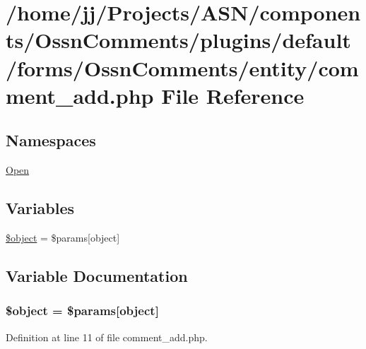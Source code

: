\hypertarget{entity_2comment__add_8php}{}\section{/home/jj/\+Projects/\+A\+S\+N/components/\+Ossn\+Comments/plugins/default/forms/\+Ossn\+Comments/entity/comment\+\_\+add.php File Reference}
\label{entity_2comment__add_8php}
\subsection*{Namespaces}
\begin{DoxyCompactItemize}
\item 
 \hyperlink{namespace_open}{Open}
\end{DoxyCompactItemize}
\subsection*{Variables}
\begin{DoxyCompactItemize}
\item 
\hyperlink{entity_2comment__add_8php_a52123b83a1952a68c5513e47d59ec4a6}{\$object} = \$params\mbox{[}\textquotesingle{}object\textquotesingle{}\mbox{]}
\end{DoxyCompactItemize}


\subsection{Variable Documentation}
\subsubsection[{\texorpdfstring{\$object}{$object}}]{\setlength{\rightskip}{0pt plus 5cm}\$object = \$params\mbox{[}\textquotesingle{}object\textquotesingle{}\mbox{]}}\hypertarget{entity_2comment__add_8php_a52123b83a1952a68c5513e47d59ec4a6}{}\label{entity_2comment__add_8php_a52123b83a1952a68c5513e47d59ec4a6}


Definition at line 11 of file comment\+\_\+add.\+php.

